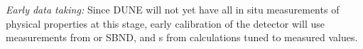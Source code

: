 \textit{Early data taking:} Since DUNE will not yet have all in situ measurements of \lar physical properties at this stage, early calibration of the detector will use \lar measurements from  or SBND, and \efield{}s from calculations tuned to measured  values.
